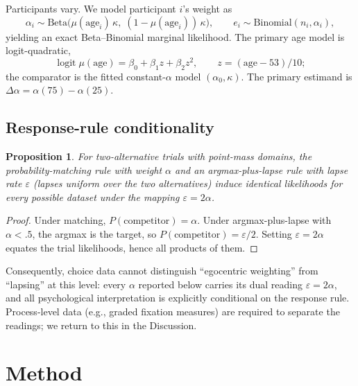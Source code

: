 \documentclass[11pt]{article}
\newtheorem{proposition}{Proposition}
\newcommand{\dalpha}{\ensuremath{\Delta\alpha}}
\begin{document}
Participants vary. We model participant $i$'s weight as
\begin{equation}\label{eq:hierarchy}
  \alpha_i \sim \mathrm{Beta}\!\big(\mu(\mathrm{age}_i)\,\kappa,\;
    (1-\mu(\mathrm{age}_i))\,\kappa\big), \qquad
  e_i \sim \mathrm{Binomial}(n_i, \alpha_i),
\end{equation}
yielding an exact Beta--Binomial marginal likelihood. The primary age model is
logit-quadratic,
\begin{equation}\label{eq:curve}
  \operatorname{logit} \mu(\mathrm{age}) = \beta_0 + \beta_1 z + \beta_2 z^2,
  \qquad z = (\mathrm{age} - 53)/10;
\end{equation}
the comparator is the fitted constant-$\alpha$ model $(\alpha_0, \kappa)$. The
primary estimand is $\dalpha = \alpha(75) - \alpha(25)$.

\subsection{Response-rule conditionality}\label{sec:equivalence}

\begin{proposition}\label{prop:equivalence}
For two-alternative trials with point-mass domains, the probability-matching
rule with weight $\alpha$ and an argmax-plus-lapse rule with lapse rate
$\varepsilon$ (lapses uniform over the two alternatives) induce identical
likelihoods for every possible dataset under the mapping
$\varepsilon = 2\alpha$.
\end{proposition}

\begin{proof}
Under matching, $P(\text{competitor}) = \alpha$. Under argmax-plus-lapse with
$\alpha < .5$, the argmax is the target, so
$P(\text{competitor}) = \varepsilon/2$. Setting $\varepsilon = 2\alpha$ equates
the trial likelihoods, hence all products of them.
\end{proof}

Consequently, choice data cannot distinguish ``egocentric weighting'' from
``lapsing'' at this level: every $\alpha$ reported below carries its dual
reading $\varepsilon = 2\alpha$, and all psychological interpretation is
explicitly conditional on the response rule. Process-level data (e.g., graded
fixation measures) are required to separate the readings; we return to this in
the Discussion.

\section{Method}\label{sec:method}
\end{document}
